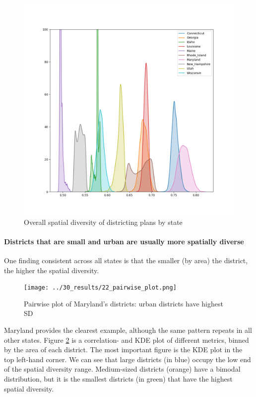 \documentclass[]{article}
\let\oldparagraph\paragraph
\renewcommand{\paragraph}[1]{\oldparagraph{#1}\mbox{}}
\begin{document}
\begin{figure}
\centering
\includegraphics{../30_results/all_plans_sd.png}
\caption{Overall spatial diversity of districting plans by state
\label{sd_plans}}
\end{figure}

\hypertarget{districts-that-are-small-and-urban-are-usually-more-spatially-diverse}{%
\paragraph{Districts that are small and urban are usually more spatially
diverse}\label{districts-that-are-small-and-urban-are-usually-more-spatially-diverse}}

One finding consistent across all states is that the smaller (by area)
the district, the higher the spatial diversity.

\begin{figure}
\centering
\texttt{[image: ../30\_results/22\_pairwise\_plot.png]}
\caption{Pairwise plot of Maryland's districts: urban districts have
highest SD \label{pairwise_plot}}
\end{figure}

Maryland provides the clearest example, although the same pattern
repeats in all other states. Figure \ref{pairwise_plot} is a
correlation- and KDE plot of different metrics, binned by the area of
each district. The most important figure is the KDE plot in the top
left-hand corner. We can see that large districts (in blue) occupy the
low end of the spatial diversity range. Medium-sized districts (orange)
have a bimodal distribution, but it is the smallest districts (in green)
that have the highest spatial diversity.
\end{document}
